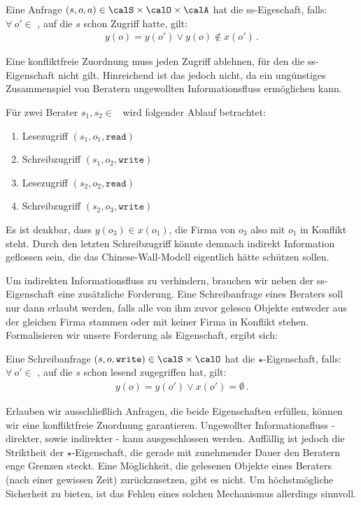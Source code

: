 \begin{definition}
	Eine Anfrage $(s, o, a) \in \calS \times \calO \times \calA$ hat die ss-Eigeschaft, falls: \(\forall\ o' \in\) \calO, auf die \(s\) schon Zugriff hatte, gilt:
	\begin{align*}
		y(o) = y(o') \lor y(o) \notin x(o')\, .
	\end{align*}
\end{definition}

Eine konfliktfreie Zuordnung muss jeden Zugriff ablehnen, für den die ss-Eigenschaft nicht gilt. Hinreichend ist das jedoch nicht, da ein ungünstiges Zusammenspiel von Beratern ungewollten Informationsfluss ermöglichen kann.

\begin{beispiel}
	Für zwei Berater \(s_1, s_2 \in\) \calS\ wird folgender Ablauf betrachtet:
	\begin{multicols}{2}
		\begin{enumerate}
			\item Lesezugriff \((s_1, o_1, \texttt{read})\)
			\item Schreibzugriff \((s_1, o_2, \texttt{write})\)
			\item Lesezugriff \((s_2, o_2, \texttt{read})\)
			\item Schreibzugriff \((s_2, o_3, \texttt{write})\)
		\end{enumerate}
	\end{multicols}
	Es ist denkbar, dass \(y(o_3) \in x(o_1)\), die Firma von \(o_3\) also mit \(o_1\) in Konflikt steht. Durch den letzten Schreibzugriff könnte demnach indirekt Information geflossen sein, die das Chinese-Wall-Modell eigentlich hätte schützen sollen. 
\end{beispiel}

Um indirekten Informationsfluss zu verhindern, brauchen wir neben der ss-Eigenschaft eine zusätzliche Forderung. Eine Schreibanfrage eines Beraters soll nur dann erlaubt werden, falls alle von ihm zuvor gelesen Objekte entweder aus der gleichen Firma stammen oder mit keiner Firma in Konflikt stehen. Formalisieren wir unsere Forderung als Eigenschaft, ergibt sich:

\begin{definition}
	Eine Schreibanfrage $(s, o, \texttt{write}) \in \calS \times \calO$ hat die \(\star\)-Eigenschaft, falls: \(\forall\ o' \in\) \calO, auf die \(s\) schon lesend zugegriffen hat, gilt:
	\begin{align*}
		y(o) = y(o') \lor x(o') = \emptyset\, .
	\end{align*}
\end{definition}

Erlauben wir ausschließlich Anfragen, die beide Eigenschaften erfüllen, können wir eine konfliktfreie Zuordnung garantieren. Ungewollter Informationsfluss - direkter, sowie indirekter - kann ausgeschlossen werden. Auffällig ist jedoch die Striktheit der \(\star\)-Eigenschaft, die gerade mit zunehmender Dauer den Beratern enge Grenzen steckt. Eine Möglichkeit, die gelesenen Objekte eines Beraters (nach einer gewissen Zeit) zurückzusetzen, gibt es nicht. Um höchstmögliche Sicherheit zu bieten, ist das Fehlen eines solchen Mechanismus allerdings sinnvoll.
